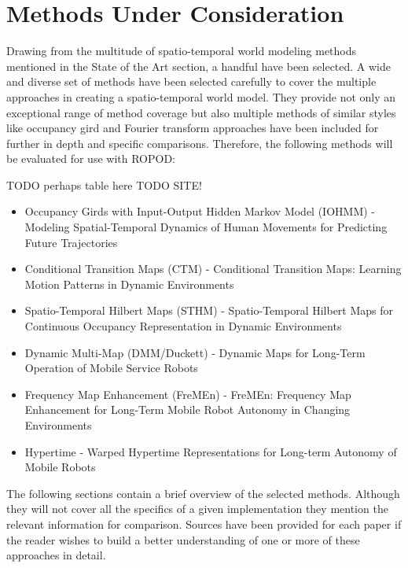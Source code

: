   \section{ Methods Under Consideration }

  Drawing from the multitude of spatio-temporal world modeling methods mentioned
  in the State of the Art section, a handful have been selected. A wide and
  diverse set of methods have been selected carefully to cover the multiple
  approaches in creating a spatio-temporal world model. They provide not only
  an exceptional range of method coverage but also multiple methods of similar
  styles like occupancy gird and Fourier transform approaches have been included
  for further in depth and specific comparisons. Therefore, the following
  methods will be evaluated for use with ROPOD:

  TODO perhaps table here
  TODO SITE!
  \begin{itemize}
    \item Occupancy Girds with Input-Output Hidden Markov Model (IOHMM) - Modeling Spatial-Temporal Dynamics of Human Movements for Predicting Future Trajectories \cite{Wang2015}
    \item Conditional Transition Maps (CTM) - Conditional Transition Maps: Learning Motion Patterns in Dynamic Environments \cite{Kucner2013}
    \item Spatio-Temporal Hilbert Maps (STHM) - Spatio-Temporal Hilbert Maps for Continuous Occupancy Representation in Dynamic Environments \cite{Senanayake2016}
    \item Dynamic Multi-Map (DMM/Duckett) - Dynamic Maps for Long-Term Operation of Mobile Service Robots \cite{biber2005}
    \item Frequency Map Enhancement (FreMEn) - FreMEn: Frequency Map Enhancement for Long-Term Mobile Robot Autonomy in Changing Environments \cite{Krajnik2015}
    \item Hypertime - Warped Hypertime Representations for Long-term Autonomy of Mobile Robots \cite{kranjik2018}
  \end{itemize}

  The following sections contain a brief overview of the selected methods.
  Although they will not cover all the specifics of a given implementation they
  mention the relevant information for comparison. Sources have been provided
  for each paper if the reader wishes to build a better understanding of one
  or more of these approaches in detail.

